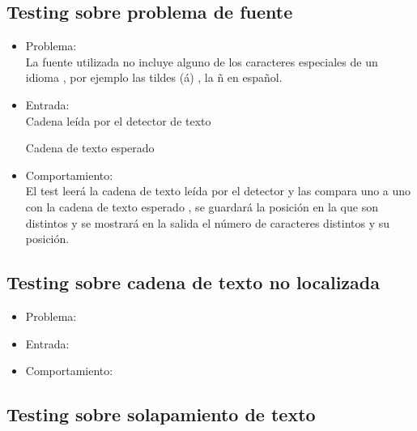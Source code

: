 \subsection{Testing sobre problema de fuente
}
\begin{itemize}
	\item Problema: \\
	La fuente utilizada no incluye alguno de los caracteres especiales de un idioma , por ejemplo las tildes (á) , la ñ en español.  \\
	\item Entrada: \\
	Cadena leída por el detector de texto
	
	Cadena de texto esperado
	
	\item Comportamiento: \\
	El test leerá la cadena de texto leída por el detector y las compara uno a uno con la cadena de texto esperado , se guardará la posición en la que son distintos y se mostrará en la salida el número de caracteres distintos y su posición.
	
\end{itemize}



\subsection{Testing sobre cadena de texto no localizada}
\begin{itemize}
	\item Problema: \\

	\item Entrada: \\

	\item Comportamiento: \\

\end{itemize}
\subsection{Testing sobre solapamiento de texto}

